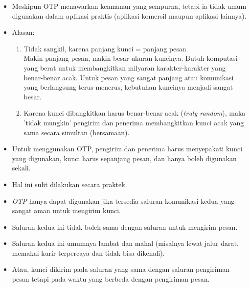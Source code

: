 \documentclass{article}
\begin{document}
\begin{itemize}
    \item Meskipun OTP menawarkan keamanan yang sempurna, tetapi ia tidak umum digunakan dalam aplikasi praktis (aplikasi komersil maupun aplikasi lainnya).
    \item Alasan:
    \begin{enumerate}
        \item Tidak sangkil, karena panjang kunci = panjang pesan. \\
        Makin panjang pesan, makin besar ukuran kuncinya. Butuh komputasi yang berat untuk membangkitkan milyaran karakter-karakter yang benar-benar acak. Untuk pesan yang sangat panjang atau komunikasi yang berlangsung terus-menerus, kebutuhan kuncinya menjadi sangat besar.
        \item Karena kunci dibangkitkan harus benar-benar acak (\textit{truly random}), maka 'tidak mungkin' pengirim dan penerima membangkitkan kunci acak yang sama secara simultan (bersamaan).
    \end{enumerate}
\end{itemize}

\newpage


\begin{itemize}
  \item Untuk menggunakan OTP, pengirim dan penerima harus menyepakati kunci yang digunakan, kunci harus sepanjang pesan, dan hanya boleh digunakan sekali.
  \item Hal ini sulit dilakukan secara praktek.
  \item \textit{OTP} hanya dapat digunakan jika tersedia saluran komunikasi kedua yang sangat aman untuk mengirim kunci.
  \item Saluran kedua ini tidak boleh sama dengan saluran untuk mengirim pesan.
  \item Saluran kedua ini umumnya lambat dan mahal (misalnya lewat jalur darat, memakai kurir terpercaya dan tidak bisa dikenali).
  \item Atau, kunci dikirim pada saluran yang sama dengan saluran pengiriman pesan tetapi pada waktu yang berbeda dengan pengiriman pesan.
\end{itemize}

\newpage

\end{document}
